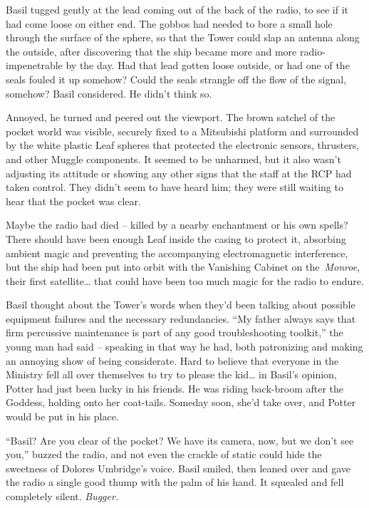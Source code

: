 Basil tugged gently at the lead coming out of the back of the radio, to
see if it had come loose on either end. The gobbos had needed to bore a
small hole through the surface of the sphere, so that the Tower could
slap an antenna along the outside, after discovering that the ship
became more and more radio-impenetrable by the day. Had that lead gotten
loose outside, or had one of the seals fouled it up somehow? Could the
seals strangle off the flow of the signal, somehow? Basil considered. He
didn't think so.

Annoyed, he turned and peered out the viewport. The brown satchel of the
pocket world was visible, securely fixed to a Mitsubishi platform and
surrounded by the white plastic Leaf spheres that protected the
electronic sensors, thrusters, and other Muggle components. It seemed to
be unharmed, but it also wasn't adjusting its attitude or showing any
other signs that the staff at the RCP had taken control. They didn't
seem to have heard him; they were still waiting to hear that the pocket
was clear.

Maybe the radio had died -- killed by a nearby enchantment or his own
spells? There should have been enough Leaf inside the casing to protect
it, absorbing ambient magic and preventing the accompanying
electromagnetic interference, but the ship had been put into orbit with
the Vanishing Cabinet on the~\emph{Monroe}, their first
satellite\ldots{} that could have been too much magic for the radio to
endure.

Basil thought about the Tower's words when they'd been talking about
possible equipment failures and the necessary redundancies. ``My father
always says that firm percussive maintenance is part of any good
troubleshooting toolkit,'' the young man had said -- speaking in that
way he had, both patronizing and making an annoying show of being
considerate. Hard to believe that everyone in the Ministry fell all over
themselves to try to please the kid\ldots{} in Basil's opinion, Potter
had just been lucky in his friends. He was riding back-broom after the
Goddess, holding onto her coat-tails. Someday soon, she'd take over, and
Potter would be put in his place.

``Basil? Are you clear of the pocket? We have its camera, now, but we
don't see you,'' buzzed the radio, and not even the crackle of static
could hide the sweetness of Dolores Umbridge's voice. Basil smiled, then
leaned over and gave the radio a single good thump with the palm of his
hand. It squealed and fell completely silent. \emph{Bugger.}

